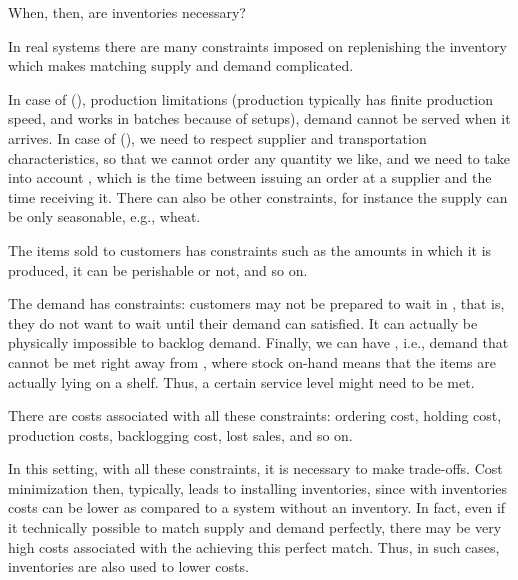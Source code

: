 \begin{exercise}
When, then, are inventories necessary?


  \begin{solution}
    In real systems there are many constraints imposed on replenishing
    the inventory which makes matching supply and demand
    complicated.

    In case of  (), production limitations (production typically has     finite production speed, and works in batches because of setups),
    demand cannot be served when it arrives.  In case of  (), we need
    to respect supplier and transportation characteristics, so that we
    cannot order any quantity we like, and we need to take into
    account , which is the time between issuing an order at a supplier and the time receiving it. There can also be other
    constraints, for instance the supply can be only seasonable, e.g.,
    wheat.

    The items sold to customers has constraints such as the amounts in
    which it is produced, it can be perishable or not, and so on.

    The demand has constraints: customers may not be prepared to wait
    in , that is, they do not want to wait until their demand can satisfied.   It can actually be physically impossible to backlog
    demand. Finally, we can have , i.e., demand that cannot be met right away from , where stock on-hand means that the items are actually lying on a shelf. Thus, a certain  service level might need to be met.

    There are costs associated with all these constraints: ordering
    cost, holding cost, production costs, backlogging cost, lost
    sales, and so on.

    In this setting, with all these constraints, it is necessary to
    make trade-offs. Cost minimization then, typically, leads to
    installing inventories, since with inventories costs can be lower
    as compared to a system without an inventory. In fact, even if it technically possible to match supply and
    demand perfectly, there may be very high costs associated with the
    achieving this perfect match. Thus, in such cases, inventories are
    also used  to lower costs.
  \end{solution}
\end{exercise}

